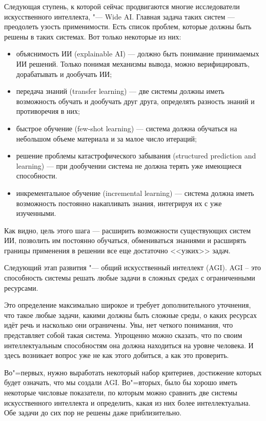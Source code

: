 \documentclass[bachelor,och,referat]{SCWorks_corrected}
\begin{document}
Следующая ступень, к которой сейчас продвигаются многие исследователи искусственного интеллекта, "--- Wide AI. Главная задача таких систем — преодолеть узость применимости. Есть список проблем, которые должны быть решены в таких системах. Вот только некоторые из них:\begin{itemize}
    \item объяснимость ИИ (explainable AI) — должно быть понимание принимаемых ИИ решений. Только понимая механизмы вывода, можно верифицировать, дорабатывать и дообучать ИИ;
    \item передача знаний (transfer learning) — две системы должны иметь возможность обучать и дообучать друг друга, определять разность знаний и противоречия в них;
    \item быстрое обучение (few-shot learning) — система должна обучаться на небольшом объеме материала и за малое число итераций;
    \item решение проблемы катастрофического забывания (structured prediction and learning) — при дообучении система не должна терять уже имеющиеся способности.
    \item инкрементальное обучение (incremental learning) — система должна иметь возможность постоянно накапливать знания, интегрируя их с уже изученными.
\end{itemize}

Как видно, цель этого шага — расширить возможности существующих систем ИИ, позволить им постоянно обучаться, обмениваться знаниями и расширять границы применения в решении все еще достаточно <<узких>> задач.\cite{N3}

Следующий этап развития "--- общий искусственный интеллект (AGI). AGI – это способность системы решать любые задачи в сложных средах с ограниченными ресурсами.

Это определение максимально широкое и требует дополнительного уточнения, что такое любые задачи, какими должны быть сложные среды, о каких ресурсах идёт речь и насколько они ограничены. Увы, нет четкого понимания, что представляет собой такая система. Упрощенно можно сказать, что по своим интеллектуальным способностям она должна находиться на уровне человека. И здесь возникает вопрос уже не как этого добиться, а как это проверить. 

Во"=первых, нужно выработать некоторый набор критериев, достижение которых будет означать, что мы создали AGI. Во"=вторых, было бы хорошо иметь некоторые числовые показатели, по которым можно сравнить две системы искусственного интеллекта и определить, какая из них более интеллектуальна. Обе задачи до сих пор не решены даже приблизительно.
\end{document}
